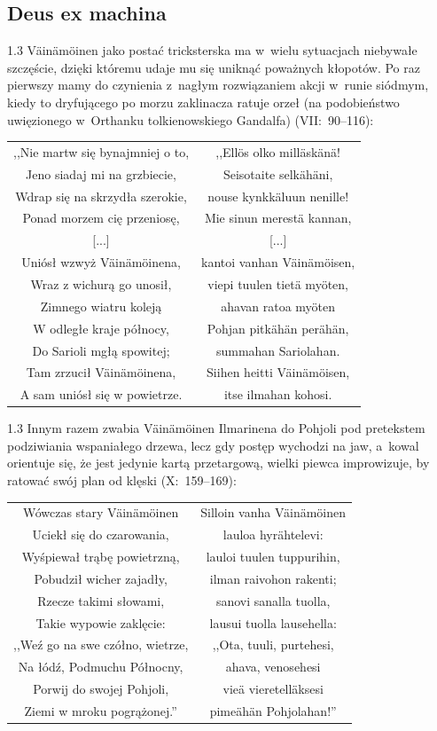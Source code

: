 \documentclass[11pt,a4paper,twoside]{report}
\begin{document}
\subsection*{Deus ex machina}
\begin{spacing}{1.3}
Väinämöinen jako postać tricksterska ma w~wielu sytuacjach niebywałe szczęście, dzięki któremu udaje mu się uniknąć poważnych kłopotów. Po raz pierwszy mamy do czynienia z~nagłym rozwiązaniem akcji w~runie siódmym, kiedy to dryfującego po morzu zaklinacza ratuje orzeł (na podobieństwo uwięzionego w~Orthanku tolkienowskiego Gandalfa) (VII:~90--116):
\end{spacing}
{\centering
\small
\begin{longtable}{c c}
,,Nie martw się bynajmniej o to, & ,,Ellös olko milläskänä!\\
Jeno siadaj mi na grzbiecie, & Seisotaite selkähäni,\\
Wdrap się na skrzydła szerokie, & nouse kynkkäluun nenille!\\
Ponad morzem cię przeniosę, & Mie sinun merestä kannan,\\
{[...]} & {[...]}\\
Uniósł wzwyż Väinämöinena, & kantoi vanhan Väinämöisen,\\
Wraz z wichurą go unosił, & viepi tuulen tietä myöten,\\
Zimnego wiatru koleją & ahavan ratoa myöten\\
W odległe kraje północy, & Pohjan pitkähän perähän,\\
Do Sarioli mgłą spowitej; & summahan Sariolahan.\\
Tam zrzucił Väinämöinena, & Siihen heitti Väinämöisen,\\
A sam uniósł się w powietrze. & itse ilmahan kohosi.\\
\end{longtable}
}
\begin{spacing}{1.3}
Innym razem zwabia Väinämöinen Ilmarinena do Pohjoli pod pretekstem podziwiania wspaniałego drzewa, lecz gdy postęp wychodzi na jaw, a~kowal orientuje się, że jest jedynie kartą przetargową, wielki piewca improwizuje, by ratować swój plan od klęski (X:~159--169):
\end{spacing}
{\centering
\small
\begin{longtable}{c c}
Wówczas stary Väinämöinen & Silloin vanha Väinämöinen \\
Uciekł się do czarowania, & lauloa hyrähtelevi: \\
Wyśpiewał trąbę powietrzną, & lauloi tuulen tuppurihin, \\
Pobudził wicher zajadły, & ilman raivohon rakenti; \\
Rzecze takimi słowami, & sanovi sanalla tuolla, \\
Takie wypowie zaklęcie: & lausui tuolla lausehella: \\
,,Weź go na swe czółno, wietrze, & ,,Ota, tuuli, purtehesi, \\
Na łódź, Podmuchu Północny, & ahava, venosehesi \\
Porwij do swojej Pohjoli, & vieä vieretelläksesi \\
Ziemi w mroku pogrążonej.'' & pimeähän Pohjolahan!'' \\
\end{longtable}
}
\end{document}
